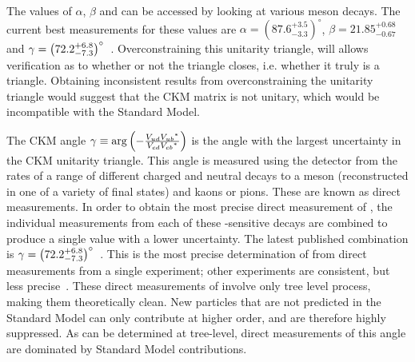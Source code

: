 The values of $\alpha$, $\beta$ and \Pgamma can be accessed by looking at various \B meson decays. The current best measurements for these values are $\alpha = \left(87.6^{+3.5}_{-3.3}\right)^{\circ}$, $\beta = 21.85^{+0.68}_{-0.67}$ and $\gamma = \left(72.2^{+6.8}_{-7.3}\right)^{\circ}$~\cite{PDG2016,LHCb-PAPER-2016-032}. Overconstraining this unitarity triangle, will allows verification as to whether or not the triangle closes, i.e. whether it truly is a triangle. Obtaining inconsistent results from overconstraining the unitarity triangle would suggest that the CKM matrix is not unitary, which would be incompatible with the Standard Model. 

The CKM angle $\gamma \equiv \arg\left(-\frac{{V_{{u}{d}}}{{V_{{u}{b}}}}^*}{{V_{{c}{d}}}{{V_{{c}{b}}}}^*}\right)$ is the angle with the largest uncertainty in the CKM unitarity triangle. This angle is measured using the \lhcb detector from the rates of a range of different charged and neutral \B decays to a \D meson (reconstructed in one of a variety of final states) and kaons or pions. These are known as direct measurements. In order to obtain the most precise direct measurement of \Pgamma, the individual measurements from each of these \Pgamma-sensitive decays are combined to produce a single value with a lower uncertainty. The latest published \lhcb combination is $\gamma = \left(72.2^{+6.8}_{-7.3}\right)^{\circ}$~\cite{LHCb-PAPER-2016-032}. This is the most precise determination of \Pgamma from direct measurements from a single experiment; other experiments are consistent, but less precise~\cite{Babar_gamma,Belle_gamma}. These direct measurements of \Pgamma involve only tree level process, making them theoretically clean. New particles that are not predicted in the Standard Model can only contribute at higher order, and are therefore highly suppressed. As \Pgamma can be determined at tree-level, direct measurements of this angle are dominated by Standard Model contributions.

